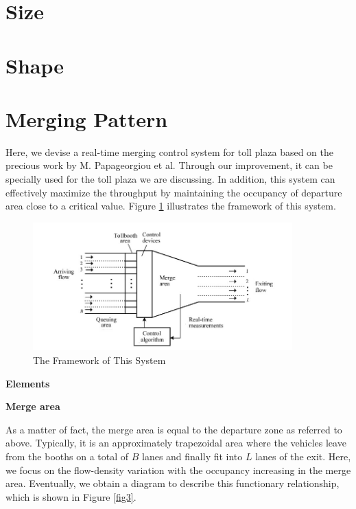 \documentclass{mcmthesis}
\begin{document}
\section{Size}

\section{Shape}

\section{Merging Pattern}

Here, we devise a real-time merging control system for
toll plaza based on the precious work by M. Papageorgiou
et al. Through our improvement, it can be specially used
for the toll plaza we are discussing. In addition, this
system can effectively maximize the throughput by
maintaining the occupancy of departure area close to a
critical value. Figure \ref{fig2} illustrates the framework of
this system.

\begin{figure}[h]
\small
\centering
\includegraphics[width=10cm]{figure2}
\caption{The Framework of This System}\label{fig2}
\end{figure}

\textbf{Elements}

\textbf{Merge area}

As a matter of fact, the merge area is equal to the
departure zone as referred to above. Typically, it
is an approximately trapezoidal area where the vehicles
leave from the booths on a total of $B$ lanes and finally
fit into $L$ lanes of the exit. Here, we focus on the
flow-density variation with the occupancy increasing
in the merge area. Eventually, we obtain a diagram to
describe this functionary relationship, which is shown
in Figure \ref{fig3}.
\end{document}
